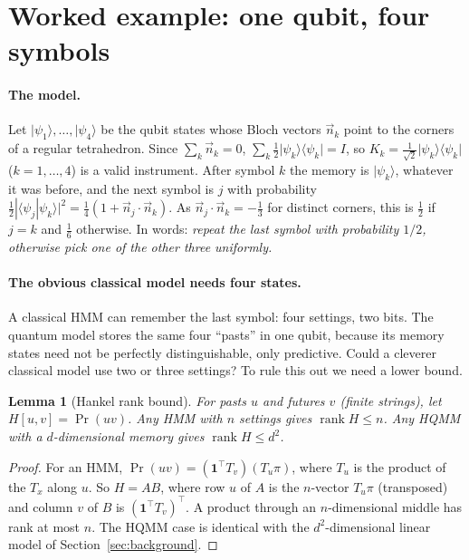 \documentclass[11pt]{article}
\newcommand{\ket}[1]{\lvert #1\rangle}
\newcommand{\bra}[1]{\langle #1\rvert}
\newcommand{\rank}{\operatorname{rank}}
\newcommand{\one}{\mathbf{1}}
\newtheorem{lemma}{Lemma}
\begin{document}
\section{Worked example: one qubit, four symbols}\label{sec:example}

\paragraph{The model.} Let $\ket{\psi_1},\dots,\ket{\psi_4}$ be the qubit states whose Bloch vectors $\vec n_k$ point to the corners of a regular tetrahedron. Since $\sum_k \vec n_k = 0$, $\sum_k \tfrac12\ket{\psi_k}\bra{\psi_k} = I$, so $K_k = \tfrac{1}{\sqrt2}\ket{\psi_k}\bra{\psi_k}$ ($k=1,\dots,4$) is a valid instrument. After symbol $k$ the memory is $\ket{\psi_k}$, whatever it was before, and the next symbol is $j$ with probability $\tfrac12|\langle\psi_j|\psi_k\rangle|^2 = \tfrac14(1+\vec n_j\cdot\vec n_k)$. As $\vec n_j\cdot\vec n_k = -\tfrac13$ for distinct corners, this is $\tfrac12$ if $j=k$ and $\tfrac16$ otherwise. In words: \emph{repeat the last symbol with probability $1/2$, otherwise pick one of the other three uniformly.}

\paragraph{The obvious classical model needs four states.} A classical HMM can remember the last symbol: four settings, two bits. The quantum model stores the same four ``pasts'' in one qubit, because its memory states need not be perfectly distinguishable, only predictive. Could a cleverer classical model use two or three settings? To rule this out we need a lower bound.

\begin{lemma}[Hankel rank bound]\label{lem:hankel}
For pasts $u$ and futures $v$ (finite strings), let $H[u,v] = \Pr(uv)$. Any HMM with $n$ settings gives $\rank H\le n$. Any HQMM with a $d$-dimensional memory gives $\rank H\le d^2$.
\end{lemma}
\begin{proof}
For an HMM, $\Pr(uv) = (\one^\top T_v)(T_u\pi)$, where $T_u$ is the product of the $T_x$ along $u$. So $H = AB$, where row $u$ of $A$ is the $n$-vector $T_u \pi$ (transposed) and column $v$ of $B$ is $(\one^\top T_v)^\top$. A product through an $n$-dimensional middle has rank at most $n$. The HQMM case is identical with the $d^2$-dimensional linear model of Section~\ref{sec:background}.
\end{proof}
\end{document}
